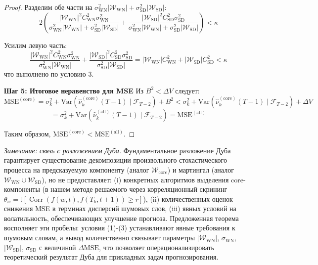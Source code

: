\documentclass[14pt,a4paper]{article}
\begin{document}
\begin{proof}
Разделим обе части на $\sigma_{\mathrm{WN}}^2 |\mathcal{W}_{\mathrm{WN}}| + \sigma_{\mathrm{SD}}^2 |\mathcal{W}_{\mathrm{SD}}|$:
\[
2 \left( \frac{|\mathcal{W}_{\mathrm{WN}}|^2 C_{\mathrm{WN}}^2 \sigma_{\mathrm{WN}}^2}{\sigma_{\mathrm{WN}}^2 |\mathcal{W}_{\mathrm{WN}}| + \sigma_{\mathrm{SD}}^2 |\mathcal{W}_{\mathrm{SD}}|} + \frac{|\mathcal{W}_{\mathrm{SD}}|^2 C_{\mathrm{SD}}^2 \sigma_{\mathrm{SD}}^2}{\sigma_{\mathrm{WN}}^2 |\mathcal{W}_{\mathrm{WN}}| + \sigma_{\mathrm{SD}}^2 |\mathcal{W}_{\mathrm{SD}}|} \right) < \kappa
\]

Усилим левую часть:
\[
\frac{|\mathcal{W}_{\mathrm{WN}}|^2 C_{\mathrm{WN}}^2 \sigma_{\mathrm{WN}}^2}{\sigma_{\mathrm{WN}}^2 |\mathcal{W}_{\mathrm{WN}}|} + \frac{|\mathcal{W}_{\mathrm{SD}}|^2 C_{\mathrm{SD}}^2 \sigma_{\mathrm{SD}}^2}{\sigma_{\mathrm{SD}}^2 |\mathcal{W}_{\mathrm{SD}}|} = |\mathcal{W}_{\mathrm{WN}}| C_{\mathrm{WN}}^2 + |\mathcal{W}_{\mathrm{SD}}| C_{\mathrm{SD}}^2 < \kappa
\]
что выполнено по условию 3.

\textbf{Шаг 5: Итоговое неравенство для MSE}
Из $B^2 < \Delta V$ следует:
\[
\mathrm{MSE}^{(\mathrm{core})} = \sigma_k^2 + \mathrm{Var}\left( \widehat{\nu}_k^{(\mathrm{core})}(T-1) \mid \mathcal{F}_{T-2} \right) + B^2 < \sigma_k^2 + \mathrm{Var}\left( \widehat{\nu}_k^{(\mathrm{core})}(T-1) \mid \mathcal{F}_{T-2} \right) + \Delta V
\]
\[
= \sigma_k^2 + \mathrm{Var}\left( \widehat{\nu}_k^{(\mathrm{all})}(T-1) \mid \mathcal{F}_{T-2} \right) = \mathrm{MSE}^{(\mathrm{all})}
\]

Таким образом, $\mathrm{MSE}^{(\mathrm{core})} < \mathrm{MSE}^{(\mathrm{all})}$.

\end{proof}

\textit{Замечание: связь с разложением Дуба.} 
Фундаментальное разложение Дуба \cite{Doob1953} гарантирует существование декомпозиции произвольного стохастического процесса на предсказуемую компоненту (аналог $\mathcal{W}_{\mathrm{core}}$) и мартингал (аналог $\mathcal{W}_{\mathrm{WN}} \cup \mathcal{W}_{\mathrm{SD}}$), но не предоставляет: 
(i) конкретных алгоритмов выделения core-компоненты (в нашем методе решаемого через корреляционный скрининг $\theta_w = \mathbb{I}[\operatorname{Corr}(f(w,t), f(T_k,t+1)) \geq r]$), 
(ii) количественных оценок снижения MSE в терминах дисперсий шумовых слов, 
(iii) явных условий на волатильность, обеспечивающих улучшение прогноза. 
Предложенная теорема восполняет эти пробелы: условия (1)-(3) устанавливают явные требования к шумовым словам, а вывод количественно связывает параметры $|\mathcal{W}_{\mathrm{WN}}|$, $\sigma_{\mathrm{WN}}$, $|\mathcal{W}_{\mathrm{SD}}|$, $\sigma_{\mathrm{SD}}$ с величиной $\Delta \mathrm{MSE}$, что позволяет операционализировать теоретический результат Дуба для прикладных задач прогнозирования.
\end{document}
